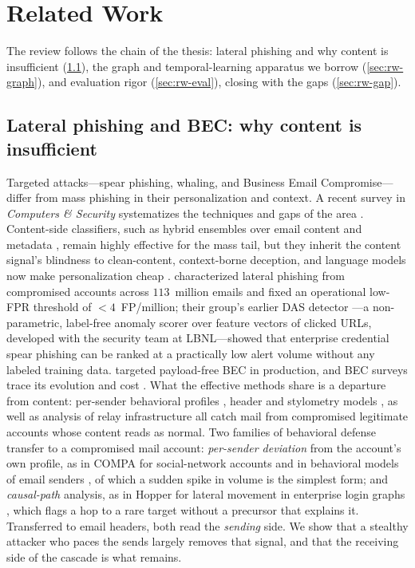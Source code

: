 \section{Related Work}
\label{sec:related}

The review follows the chain of the thesis: lateral phishing and why content is insufficient
(\ref{sec:rw-spear}), the graph and temporal-learning apparatus we borrow (\ref{sec:rw-graph}), and
evaluation rigor (\ref{sec:rw-eval}), closing with the gaps (\ref{sec:rw-gap}).

\subsection{Lateral phishing and BEC: why content is insufficient}
\label{sec:rw-spear}
Targeted attacks---spear phishing, whaling, and Business Email Compromise---differ from mass phishing in their personalization and context.
A recent survey in \emph{Computers \& Security} systematizes the techniques and gaps
of the area \citep{birthriya2025detection}. Content-side classifiers, such as hybrid ensembles over email
content and metadata \citep{bountakas2022helphed}, remain highly effective for the mass tail, but they
inherit the content signal's blindness to clean-content, context-borne deception, and language models now
make personalization cheap \citep{bethany2024evaluating}.
\citet{ho2019detecting} characterized lateral phishing from
compromised accounts across $113$~million emails and fixed an operational low-FPR threshold of $<\!4$~FP/million;
their group's earlier DAS detector \citep{ho2017detecting}---a non-parametric, label-free anomaly
scorer over feature vectors of clicked URLs, developed with the security team at LBNL---showed that
enterprise credential spear phishing can be ranked at a practically low alert volume without any
labeled training data.
\citet{cidon2019high} targeted payload-free BEC in production, and BEC surveys trace its evolution and cost
\citep{atlam2023business}. What the effective methods share is a departure from content: per-sender behavioral
profiles \citep{gascon2018reading,stringhini2015thataint}, header and stylometry models
\citep{duman2016emailprofiler}, as well as analysis of relay infrastructure \citep{luo2024characterizing} all catch mail
from compromised legitimate accounts whose content reads as normal. Two families of behavioral defense
transfer to a compromised mail account: \emph{per-sender deviation} from the account's own profile, as in COMPA
for social-network accounts \citep{egele2013compa} and in behavioral models of email senders
\citep{stringhini2015thataint}, of which a sudden spike in volume is the simplest form; and \emph{causal-path}
analysis, as in Hopper for lateral movement in enterprise login graphs \citep{ho2021hopper}, which flags a hop to
a rare target without a precursor that explains it. Transferred to email headers, both read the
\emph{sending} side. We show that a stealthy attacker who paces the sends largely removes that signal, and that the receiving side of the
cascade is what remains.

